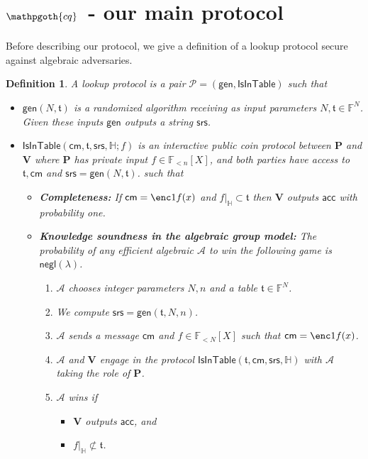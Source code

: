 \documentclass[11pt]{article} %
\newcommand{\cq}{\ensuremath{\mathpgoth{cq} }\xspace}
\newcommand{\F}{\ensuremath{\mathbb F}\xspace}
\newcommand{\adv}{\ensuremath{\mathcal A}\xspace}
\newcommand{\srs}{\ensuremath{\mathsf{srs}}\xspace}
\newcommand{\cm}{\ensuremath{\mathsf{cm}}\xspace}
\newcommand{\negl}{\ensuremath{\mathsf{negl}(\lambda)}\xspace}
\newcommand{\acc}{\ensuremath{\mathsf{acc}}\xspace}
\newcommand{\gen}{\ensuremath{\mathsf{gen}}\xspace}
\newcommand{\prv}{\ensuremath{\mathsf{\mathbf{P}}}\xspace}
\newcommand{\ver}{\ensuremath{\mathsf{\mathbf{V}}}\xspace}
\newcommand{\polysofdeg}[1]{\ensuremath{\F_{< #1}[X]}\xspace}
\newcommand{\prot}{\ensuremath{\mathscr{P}}\xspace}
\newtheorem{dfn}[lemma]{Definition}
\newcommand{\restricttoset}[2]{\ensuremath{#1|_{#2}}\xspace}
\newcommand{\isintable}{\ensuremath{\mathsf{IsInTable}}\xspace}
\newcommand{\subspace}{\ensuremath{\mathbb{H}}\xspace}
\newcommand{\witsize}{\ensuremath{n}\xspace}
\newcommand{\tabsize}{\ensuremath{N}\xspace}
\newcommand{\tab}{\ensuremath{\mathfrak{t}}\xspace}
\begin{document}
\section{$\cq\;$ - our main protocol}
Before describing our protocol, we give a definition of a lookup protocol secure against algebraic adversaries.
\begin{dfn}\label{dfn:lookupprot}
A \emph{lookup protocol} is a pair $\prot=(\gen,\isintable)$ such that
\begin{itemize}
 \item $\gen(\tabsize,\tab)$ is a randomized algorithm receiving as input parameters $\tabsize,\tab\in \F^\tabsize$. 
 Given these inputs \gen outputs a string \srs.
 \item $\isintable(\cm,\tab,\srs,\subspace;f)$ is an interactive public coin protocol between \prv and \ver where \prv has private input $f\in \polysofdeg{\witsize}$, and both parties have access to $\tab,\cm$ and  $\srs=\gen(\tabsize,\tab)$.
 such that
 \begin{itemize}
  \item \textbf{Completeness:} If $\cm=\enc1{f(x)}$ and $\restricttoset{f}{\subspace}\subset \tab$ then \ver outputs \acc with probability one.
  \item \textbf{Knowledge soundness in the algebraic group model:}
    The probability of any efficient algebraic \adv to win the following game is \negl.

\begin{enumerate}
\item \adv chooses integer parameters $\tabsize,\witsize$ and a table $\tab\in \F^\tabsize$.
 \item We compute $\srs=\gen(\tab,\tabsize,\witsize)$.
 \item \adv sends a message \cm and $f\in\polysofdeg{\tabsize}$ such that $\cm=\enc1{f(x)}$.
 \item \adv and \ver engage in the protocol $\isintable(\tab,\cm,\srs,\subspace)$ with \adv taking the role of \prv.
 \item \adv wins if 
 \begin{itemize}
  \item \ver outputs \acc, and
  \item $\restricttoset{f}{\subspace}\not\subset \tab$.
 \end{itemize}

\end{enumerate}
\end{itemize}
\end{itemize}
\end{dfn}
\end{document}
